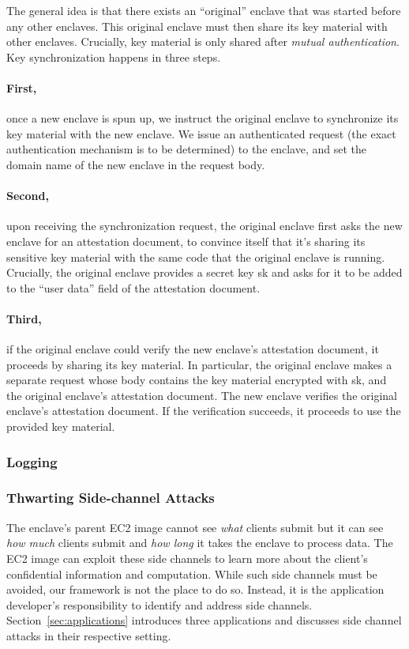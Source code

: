 The general idea is that there exists an ``original'' enclave that was started
before any other enclaves. This original enclave must then share its key
material with other enclaves.  Crucially, key material is only shared after
\emph{mutual authentication}.  Key synchronization happens in three steps.


\paragraph{First,} once a new enclave is spun up, we instruct the original
enclave to synchronize its key material with the new enclave. We issue an
authenticated request (the exact authentication mechanism is to be determined)
to the enclave, and set the domain name of the new enclave in the request body.

\paragraph{Second,} upon receiving the synchronization request, the original
enclave first asks the new enclave for an attestation document, to convince
itself that it’s sharing its sensitive key material with the same code that the
original enclave is running. Crucially, the original enclave provides a secret
key sk and asks for it to be added to the “user data” field of the attestation
document.

\paragraph{Third,} if the original enclave could verify the new enclave’s
attestation document, it proceeds by sharing its key material. In particular,
the original enclave makes a separate request whose body contains the key
material encrypted with sk, and the original enclave’s attestation document.
The new enclave verifies the original enclave’s attestation document. If the
verification succeeds, it proceeds to use the provided key material.

\subsubsection{Logging}
\label{sec:logging}


\subsubsection{Thwarting Side-channel Attacks}
\label{sec:side-channels}

The enclave's parent EC2 image cannot see \emph{what} clients submit but it can
see \emph{how much} clients submit and \emph{how long} it takes the enclave to
process data.  The EC2 image can exploit these side channels to learn more
about the client's confidential information and computation.  While such side
channels must be avoided, our framework is not the place to do so.  Instead, it
is the application developer's responsibility to identify and address side
channels.  Section~\ref{sec:applications} introduces three applications and
discusses side channel attacks in their respective setting.
